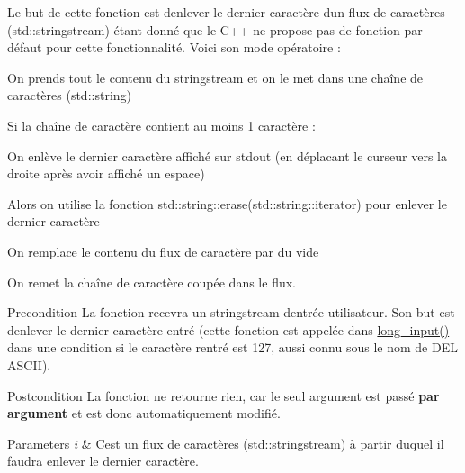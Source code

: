 Le but de cette fonction est d\textquotesingle{}enlever le dernier caractère d\textquotesingle{}un flux de caractères (std\+::stringstream) étant donné que le C++ ne propose pas de fonction par défaut pour cette fonctionnalité. Voici son mode opératoire \+:
\begin{DoxyEnumerate}
\item On prends tout le contenu du stringstream et on le met dans une chaîne de caractères (std\+::string)
\item Si la chaîne de caractère contient au moins 1 caractère \+:
\begin{DoxyEnumerate}
\item On enlève le dernier caractère affiché sur stdout (en déplacant le curseur vers la droite après avoir affiché un espace)
\item Alors on utilise la fonction std\+::string\+::erase(std\+::string\+::iterator) pour enlever le dernier caractère
\item On remplace le contenu du flux de caractère par du vide
\item On remet la chaîne de caractère coupée dans le flux.
\end{DoxyEnumerate}
\end{DoxyEnumerate}

\begin{DoxyPrecond}{Precondition}
La fonction recevra un stringstream d\textquotesingle{}entrée utilisateur. Son but est d\textquotesingle{}enlever le dernier caractère entré (cette fonction est appelée dans \hyperlink{namespaceio_ab044be3afd7ac04eeb1a496af0f1d5c6}{long\+\_\+input()} dans une condition si le caractère rentré est 127, aussi connu sous le nom de D\+EL A\+S\+C\+II). 
\end{DoxyPrecond}
\begin{DoxyPostcond}{Postcondition}
La fonction ne retourne rien, car le seul argument est passé {\bfseries par argument} et est donc automatiquement modifié. 
\end{DoxyPostcond}

\begin{DoxyParams}{Parameters}
{\em i} & C\textquotesingle{}est un flux de caractères (std\+::stringstream) à partir duquel il faudra enlever le dernier caractère. \\
\hline
\end{DoxyParams}
\mbox{\label{namespaceio_a44a79937063c75bdcd8f042d5f55d501}} 
